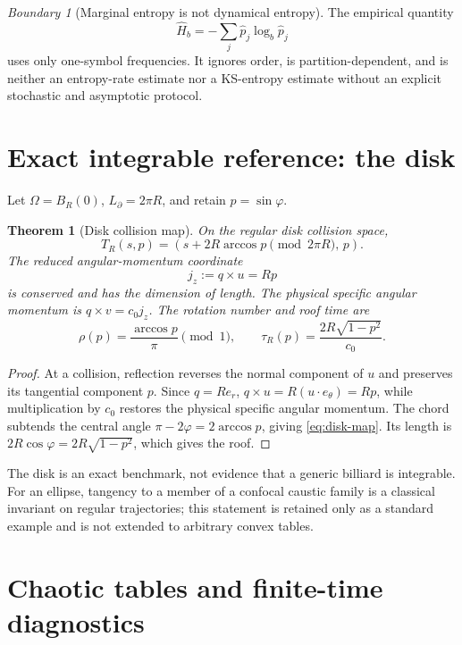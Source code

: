\documentclass[11pt,a4paper]{article}
\theoremstyle{definition}
\theoremstyle{plain}
\newtheorem{theorem}[definition]{Theorem}
\theoremstyle{remark}
\newtheorem{warning}[definition]{Boundary}
\begin{document}
\begin{warning}[Marginal entropy is not dynamical entropy]
The empirical quantity
\[
\widehat H_b=-\sum_j\widehat p_j\log_b\widehat p_j
\]
uses only one-symbol frequencies. It ignores order, is
partition-dependent, and is neither an entropy-rate estimate nor a
KS-entropy estimate without an explicit stochastic and asymptotic
protocol.
\end{warning}

\section{Exact integrable reference: the disk}

Let \(\Omega=B_R(0)\), \(L_\partial=2\pi R\), and retain
\(p=\sin\varphi\).

\begin{theorem}[Disk collision map]\label{thm:disk-map}
On the regular disk collision space,
\begin{equation}\label{eq:disk-map}
T_R(s,p)
=\left(s+2R\arccos p\pmod{2\pi R},\,p\right).
\end{equation}
The reduced angular-momentum coordinate
\[
j_z:=q\times u=Rp
\]
is conserved and has the dimension of length.  The physical specific
angular momentum is \(q\times v=c_0j_z\).  The rotation number and roof
time are
\begin{equation}\label{eq:disk-readouts}
\rho(p)=\frac{\arccos p}{\pi}\pmod1,\qquad
\tau_R(p)=\frac{2R\sqrt{1-p^2}}{c_0}.
\end{equation}
\end{theorem}

\begin{proof}
At a collision, reflection reverses the normal component of \(u\) and
preserves its tangential component \(p\). Since \(q=Re_r\),
\(q\times u=R(u\cdot e_\theta)=Rp\), while multiplication by \(c_0\)
restores the physical specific angular momentum. The chord subtends
the central angle \(\pi-2\varphi=2\arccos p\), giving
\cref{eq:disk-map}. Its length is
\(2R\cos\varphi=2R\sqrt{1-p^2}\), which gives the roof.
\end{proof}

The disk is an exact benchmark, not evidence that a generic billiard
is integrable. For an ellipse, tangency to a member of a confocal
caustic family is a classical invariant on regular trajectories; this
statement is retained only as a standard example and is not extended
to arbitrary convex tables.

\section{Chaotic tables and finite-time diagnostics}
\end{document}
